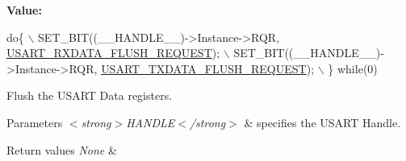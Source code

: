 {\bfseries Value\+:}
\begin{DoxyCode}
\textcolor{keywordflow}{do}\{                \(\backslash\)
      SET\_BIT((\_\_HANDLE\_\_)->Instance->RQR, \hyperlink{group___u_s_a_r_t___request___parameters_ga3d08169bc6516ef929b161f47ecba555}{USART\_RXDATA\_FLUSH\_REQUEST}); \(\backslash\)
      SET\_BIT((\_\_HANDLE\_\_)->Instance->RQR, \hyperlink{group___u_s_a_r_t___request___parameters_ga5d3de7b3c6b8f2691dc6ddae10c2355d}{USART\_TXDATA\_FLUSH\_REQUEST}); \(\backslash\)
    \}  \textcolor{keywordflow}{while}(0)
\end{DoxyCode}


Flush the U\+S\+A\+RT Data registers. 


\begin{DoxyParams}{Parameters}
{\em $<$strong$>$\+H\+A\+N\+D\+L\+E$<$/strong$>$} & specifies the U\+S\+A\+RT Handle. \\
\hline
\end{DoxyParams}

\begin{DoxyRetVals}{Return values}
{\em None} & \\
\hline
\end{DoxyRetVals}
